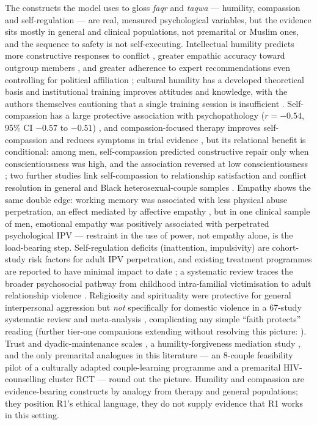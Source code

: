The constructs the model uses to gloss \emph{faqr} and \emph{taqwa} --- humility, compassion and self-regulation --- are real, measured psychological variables, but the evidence sits mostly in general and clinical populations, not premarital or Muslim ones, and the sequence to safety is not self-executing. Intellectual humility predicts more constructive responses to conflict \cite{ref203}, greater empathic accuracy toward outgroup members \cite{ref204}, and greater adherence to expert recommendations even controlling for political affiliation \cite{ref205}; cultural humility has a developed theoretical basis \cite{ref206,ref207} and institutional training improves attitudes and knowledge, with the authors themselves cautioning that a single training session is insufficient \cite{ref208}. Self-compassion has a large protective association with psychopathology ($r=-0.54$, 95\% CI $-0.57$ to $-0.51$) \cite{ref209}, and compassion-focused therapy improves self-compassion and reduces symptoms in trial evidence \cite{ref210}, but its relational benefit is conditional: among men, self-compassion predicted constructive repair only when conscientiousness was high, and the association reversed at low conscientiousness \cite{ref211}; two further studies link self-compassion to relationship satisfaction and conflict resolution in general and Black heterosexual-couple samples \cite{ref212,ref213}. Empathy shows the same double edge: working memory was associated with less physical abuse perpetration, an effect mediated by affective empathy \cite{ref214}, but in one clinical sample of men, emotional empathy was positively associated with perpetrated psychological IPV \cite{ref215} --- restraint in the use of power, not empathy alone, is the load-bearing step. Self-regulation deficits (inattention, impulsivity) are cohort-study risk factors for adult IPV perpetration, and existing treatment programmes are reported to have minimal impact to date \cite{ref216}; a systematic review traces the broader psychosocial pathway from childhood intra-familial victimisation to adult relationship violence \cite{ref217}. Religiosity and spirituality were protective for general interpersonal aggression but \emph{not} specifically for domestic violence in a 67-study systematic review and meta-analysis \cite{ref220}, complicating any simple ``faith protects'' reading (further tier-one companions extending without resolving this picture: \cite{ref221,ref223}). Trust and dyadic-maintenance scales \cite{ref218,ref219}, a humility-forgiveness mediation study \cite{ref202}, and the only premarital analogues in this literature --- an 8-couple feasibility pilot of a culturally adapted couple-learning programme \cite{ref100} and a premarital HIV-counselling cluster RCT \cite{ref224} --- round out the picture. Humility and compassion are evidence-bearing constructs by analogy from therapy and general populations; they position R1's ethical language, they do not supply evidence that R1 works in this setting.

